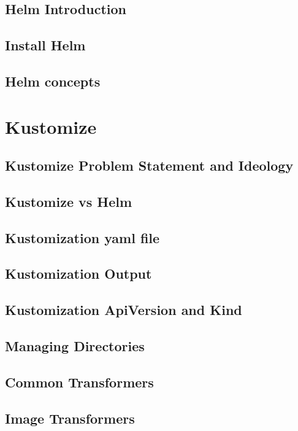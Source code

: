 \documentclass[11pt]{book}
\begin{document}
    \section{Helm Introduction}

    \section{Install Helm}

    \section{Helm concepts}

    \chapter{Kustomize}

    \section{Kustomize Problem Statement and Ideology}

    \section{Kustomize vs Helm}

    \section{Kustomization yaml file}

    \section{Kustomization Output}

    \section{Kustomization ApiVersion and Kind}

    \section{Managing Directories}

    \section{Common Transformers}

    \section{Image Transformers}
\end{document}
